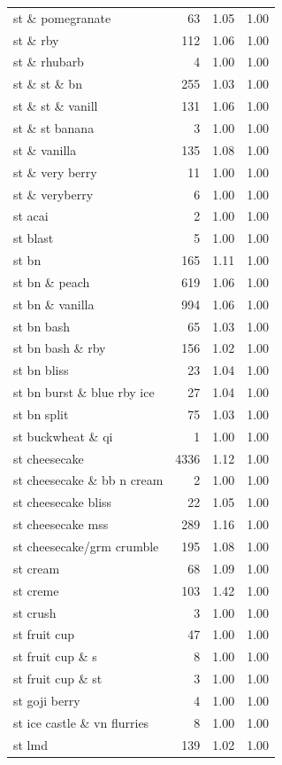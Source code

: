 \begin{table}
\begin{tabular}{lrrr}
st \& pomegranate & 63 & 1.05 & 1.00 \\
st \& rby & 112 & 1.06 & 1.00 \\
st \& rhubarb & 4 & 1.00 & 1.00 \\
st \& st \& bn & 255 & 1.03 & 1.00 \\
st \& st \& vanill & 131 & 1.06 & 1.00 \\
st \& st banana & 3 & 1.00 & 1.00 \\
st \& vanilla & 135 & 1.08 & 1.00 \\
st \& very berry & 11 & 1.00 & 1.00 \\
st \& veryberry & 6 & 1.00 & 1.00 \\
st acai & 2 & 1.00 & 1.00 \\
st blast & 5 & 1.00 & 1.00 \\
st bn & 165 & 1.11 & 1.00 \\
st bn \& peach & 619 & 1.06 & 1.00 \\
st bn \& vanilla & 994 & 1.06 & 1.00 \\
st bn bash & 65 & 1.03 & 1.00 \\
st bn bash \& rby & 156 & 1.02 & 1.00 \\
st bn bliss & 23 & 1.04 & 1.00 \\
st bn burst \& blue rby ice & 27 & 1.04 & 1.00 \\
st bn split & 75 & 1.03 & 1.00 \\
st buckwheat \& qi & 1 & 1.00 & 1.00 \\
st cheesecake & 4336 & 1.12 & 1.00 \\
st cheesecake \& bb n cream & 2 & 1.00 & 1.00 \\
st cheesecake bliss & 22 & 1.05 & 1.00 \\
st cheesecake mss & 289 & 1.16 & 1.00 \\
st cheesecake/grm crumble & 195 & 1.08 & 1.00 \\
st cream & 68 & 1.09 & 1.00 \\
st creme & 103 & 1.42 & 1.00 \\
st crush & 3 & 1.00 & 1.00 \\
st fruit cup & 47 & 1.00 & 1.00 \\
st fruit cup \& s & 8 & 1.00 & 1.00 \\
st fruit cup \& st & 3 & 1.00 & 1.00 \\
st goji berry & 4 & 1.00 & 1.00 \\
st ice castle \& vn flurries & 8 & 1.00 & 1.00 \\
st lmd & 139 & 1.02 & 1.00 \\

\end{tabular}
\end{table}
